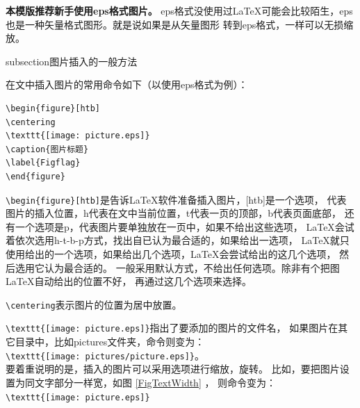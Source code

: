 {\bfseries 本模版推荐新手使用eps格式图片。}
eps格式没使用过\LaTeX 可能会比较陌生，eps也是一种矢量格式图形。就是说如果是从矢量图形
转到eps格式，一样可以无损缩放。

subsection{图片插入的一般方法}

在文中插入图片的常用命令如下（以使用eps格式为例）：

{
\linespread{1}
\noindent
\begin{verbatim}
\begin{figure}[htb]
\centering
\texttt{[image: picture.eps]}
\caption{图片标题}
\label{Figflag}
\end{figure}
\end{verbatim}
}

\verb+\begin{figure}[htb]+是告诉\LaTeX 软件准备插入图片，[htb]是一个选项，
代表图片的插入位置，h代表在文中当前位置，t代表一页的顶部，b代表页面底部，
还有一个选项是p，代表图片要单独放在一页中，如果不给出这些选项，
\LaTeX 会试着依次选用h-t-b-p方式，找出自已认为最合适的，如果给出一选项，
\LaTeX 就只使用给出的一个选项，如果给出几个选项，\LaTeX 会尝试给出的这几个选项，
然后选用它认为最合适的。
一般采用默认方式，不给出任何选项。除非有个把图\LaTeX 自动给出的位置不好，
再通过这几个选项来选择。

\verb+\centering+表示图片的位置为居中放置。

\verb+\texttt{[image: picture.eps]}+指出了要添加的图片的文件名，
如果图片在其它目录中，比如pictures文件夹，命令则变为：\\
\verb+\texttt{[image: pictures/picture.eps]}+。\\
要着重说明的是，插入的图片可以采用选项进行缩放，旋转。
比如，要把图片设置为同文字部分一样宽，如图 \ref{FigTextWidth} ，
则命令变为：\\
\verb+\texttt{[image: picture.eps]}+

